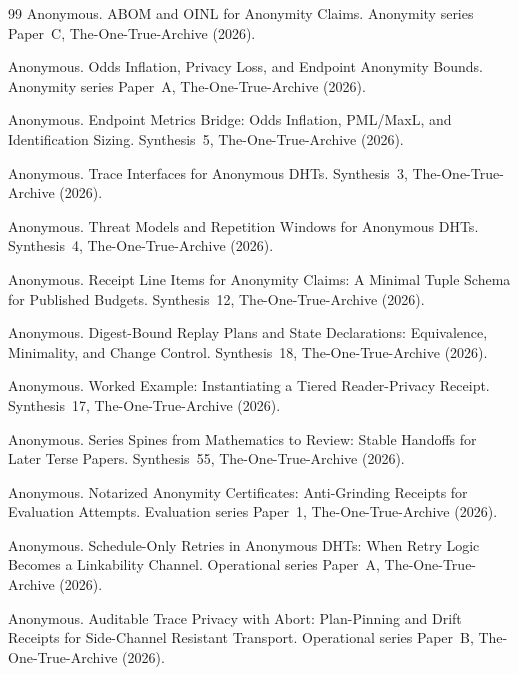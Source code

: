 \documentclass[11pt]{article}
\begin{document}
\begin{thebibliography}{99}
Anonymous.
\newblock ABOM and OINL for Anonymity Claims.
\newblock Anonymity series Paper~C, The-One-True-Archive (2026).

Anonymous.
\newblock Odds Inflation, Privacy Loss, and Endpoint Anonymity Bounds.
\newblock Anonymity series Paper~A, The-One-True-Archive (2026).

Anonymous.
\newblock Endpoint Metrics Bridge: Odds Inflation, PML/MaxL, and Identification Sizing.
\newblock Synthesis~5, The-One-True-Archive (2026).

Anonymous.
\newblock Trace Interfaces for Anonymous DHTs.
\newblock Synthesis~3, The-One-True-Archive (2026).

Anonymous.
\newblock Threat Models and Repetition Windows for Anonymous DHTs.
\newblock Synthesis~4, The-One-True-Archive (2026).

Anonymous.
\newblock Receipt Line Items for Anonymity Claims: A Minimal Tuple Schema for Published Budgets.
\newblock Synthesis~12, The-One-True-Archive (2026).

Anonymous.
\newblock Digest-Bound Replay Plans and State Declarations: Equivalence, Minimality, and Change Control.
\newblock Synthesis~18, The-One-True-Archive (2026).

Anonymous.
\newblock Worked Example: Instantiating a Tiered Reader-Privacy Receipt.
\newblock Synthesis~17, The-One-True-Archive (2026).

Anonymous.
\newblock Series Spines from Mathematics to Review: Stable Handoffs for Later Terse Papers.
\newblock Synthesis~55, The-One-True-Archive (2026).

Anonymous.
\newblock Notarized Anonymity Certificates: Anti-Grinding Receipts for Evaluation Attempts.
\newblock Evaluation series Paper~1, The-One-True-Archive (2026).

Anonymous.
\newblock Schedule-Only Retries in Anonymous DHTs: When Retry Logic Becomes a Linkability Channel.
\newblock Operational series Paper~A, The-One-True-Archive (2026).

Anonymous.
\newblock Auditable Trace Privacy with Abort: Plan-Pinning and Drift Receipts for Side-Channel Resistant Transport.
\newblock Operational series Paper~B, The-One-True-Archive (2026).


\end{thebibliography}
\end{document}
